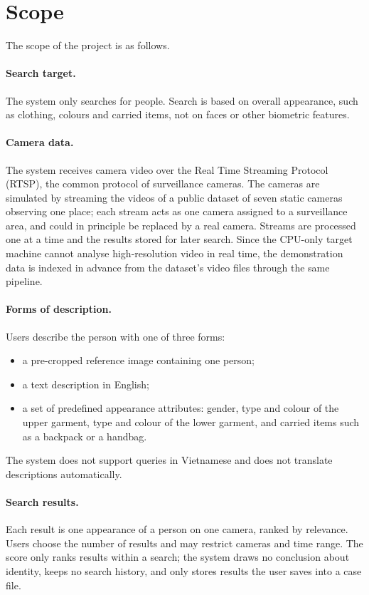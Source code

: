 \section{Scope}
\label{sec:1.3}

The scope of the project is as follows.

\paragraph{Search target.} The system only searches for people. Search is based on overall appearance, such as clothing, colours and carried items, not on faces or other biometric features.

\paragraph{Camera data.} The system receives camera video over the Real Time Streaming Protocol (RTSP), the common protocol of surveillance cameras. The cameras are simulated by streaming the videos of a public dataset of seven static cameras observing one place; each stream acts as one camera assigned to a surveillance area, and could in principle be replaced by a real camera. Streams are processed one at a time and the results stored for later search. Since the CPU-only target machine cannot analyse high-resolution video in real time, the demonstration data is indexed in advance from the dataset's video files through the same pipeline.

\paragraph{Forms of description.} Users describe the person with one of three forms:
\begin{itemize}
    \item a pre-cropped reference image containing one person;
    \item a text description in English;
    \item a set of predefined appearance attributes: gender, type and colour of the upper garment, type and colour of the lower garment, and carried items such as a backpack or a handbag.
\end{itemize}
The system does not support queries in Vietnamese and does not translate descriptions automatically.

\paragraph{Search results.} Each result is one appearance of a person on one camera, ranked by relevance. Users choose the number of results and may restrict cameras and time range. The score only ranks results within a search; the system draws no conclusion about identity, keeps no search history, and only stores results the user saves into a case file.

